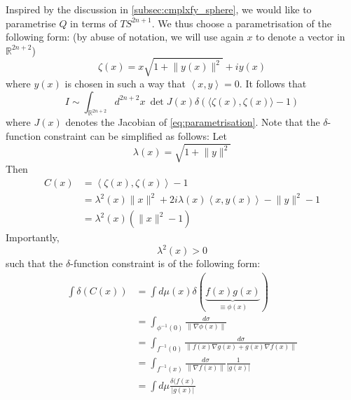 \documentclass[a4paper,11pt]{article}
\theoremstyle{definition}
\newcommand{\RR}{\mathbb{R}}
\begin{document}
Inspired by the discussion in \ref{subsec:cmplxfy_sphere}, we would like to parametrise $Q$ in terms of $TS^{2n + 1}$.
We thus choose a parametrisation of the following form: (by abuse of notation, we will use again $x$ to denote a vector in $\RR^{2n + 2}$)
\begin{equation}
  \zeta(x) = x \sqrt{1 + \lVert y(x) \rVert^2} + i y(x)
  \label{eq:parametrisation}
\end{equation}
where $y(x)$ is chosen in such a way that $\left\langle x,y \right\rangle = 0$.
It follows that 
\begin{equation}
  I \sim \int_{\RR^{2n + 2}} d^{2n + 2}x\ \det J(x) \delta(\langle \zeta(x), \zeta(x) \rangle - 1)
\end{equation}
where $J(x)$ denotes the Jacobian of \eqref{eq:parametrisation}.
Note that the $\delta$-function constraint can be simplified as follows: Let 
\begin{equation}
  \lambda(x) = \sqrt{1 + \lVert y \rVert^2}
\end{equation}
Then 
\begin{equation}
  \begin{split} 
    C(x) &= \left\langle \zeta(x), \zeta(x) \right\rangle  - 1 \\
    &= \lambda^2(x) \lVert x \rVert^2 + 2 i \lambda(x) \left\langle x, y(x) \right\rangle  - \lVert y \rVert^2 - 1\\
    &= \lambda^2(x) (\lVert x \rVert^2 - 1)
  \end{split}
\end{equation}
Importantly, 
\begin{equation}
  \lambda^2(x) > 0 
\end{equation}
such that the $\delta$-function constraint is of the following form:
\begin{equation}
  \begin{split} 
    \int \delta(C(x)) &= \int d\mu(x) \delta(\underbrace{f(x)g(x)}_{\equiv\phi(x)}) \\
    &= \int_{\phi^{-1}(0)}\frac{d\sigma}{\lVert \nabla \phi(x) \rVert} \\
    &= \int_{f^{-1}(0)} \frac{d\sigma}{\lVert f(x) \nabla g(x) + g(x) \nabla f(x) \rVert } \\
    &= \int_{f^{-1}(x)} \frac{d\sigma}{\lVert \nabla f(x) \rVert}\frac{1}{\lvert g(x) \rvert} \\
    &= \int d\mu \frac{\delta(f(x)}{\lvert g(x) \rvert}
  \end{split}
\end{equation}
\end{document}
